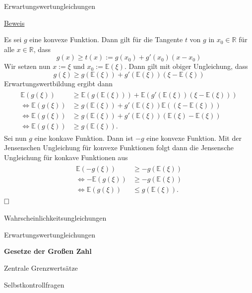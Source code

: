 \documentclass[
  8pt,
  ignorenonframetext,
]{beamer}
\begin{document}
\begin{frame}{Erwartungswertungleichungen}
\protect\hypertarget{erwartungswertungleichungen-5}{}
\footnotesize

\underline{Beweis}

Es sei \(g\) eine konvexe Funktion. Dann gilt für die Tangente \(t\) von
\(g\) in \(x_0 \in \mathbb{R}\) für alle \(x \in \mathbb{R}\), dass
\begin{equation}
g(x) \ge t(x) := g(x_0) + g'(x_0)(x - x_0)
\end{equation} Wir setzen nun \(x := \xi\) und
\(x_0 := \mathbb{E}(\xi)\). Dann gilt mit obiger Ungleichung, dass
\begin{equation}
g(\xi) \ge g(\mathbb{E}(\xi)) + g'(\mathbb{E}(\xi))(\xi - \mathbb{E}(\xi))
\end{equation} Erwartungswertbildung ergibt dann \begin{align}
\begin{split}
\mathbb{E}(g(\xi)) & \ge \mathbb{E}(g(\mathbb{E}(\xi))) + \mathbb{E}(g'(\mathbb{E}(\xi))(\xi - \mathbb{E}(\xi))) \\
\Leftrightarrow
\mathbb{E}(g(\xi)) & \ge g(\mathbb{E}(\xi)) + g'(\mathbb{E}(\xi))\mathbb{E}((\xi - \mathbb{E}(\xi))) \\
\Leftrightarrow
\mathbb{E}(g(\xi)) & \ge g(\mathbb{E}(\xi)) + g'(\mathbb{E}(\xi))(\mathbb{E}(\xi) - \mathbb{E}(\xi)) \\
\Leftrightarrow
\mathbb{E}(g(\xi)) & \ge g(\mathbb{E}(\xi)).
\end{split}
\end{align} Sei nun \(g\) eine konkave Funktion. Dann ist \(-g\) eine
konvexe Funktion. Mit der Jensenschen Ungleichung für konvexe Funktionen
folgt dann die Jensensche Ungleichung für konkave Funktionen aus
\begin{align}
\begin{split}
\mathbb{E}(-g(\xi)) & \ge -g(\mathbb{E}(\xi)) \\
\Leftrightarrow
-\mathbb{E}(g(\xi)) & \ge -g(\mathbb{E}(\xi)) \\
\Leftrightarrow
\mathbb{E}(g(\xi)) & \le g(\mathbb{E}(\xi)).
\end{split}
\end{align} \(\hfill \Box\)
\end{frame}

\begin{frame}{}
\protect\hypertarget{section-5}{}
\large
\vfill
{}

Wahrscheinlichkeitsungleichungen

Erwartungswertungleichungen

\textbf{Gesetze der Großen Zahl}

Zentrale Grenzwertsätze

Selbstkontrollfragen \vfill
\end{frame}
\end{document}
